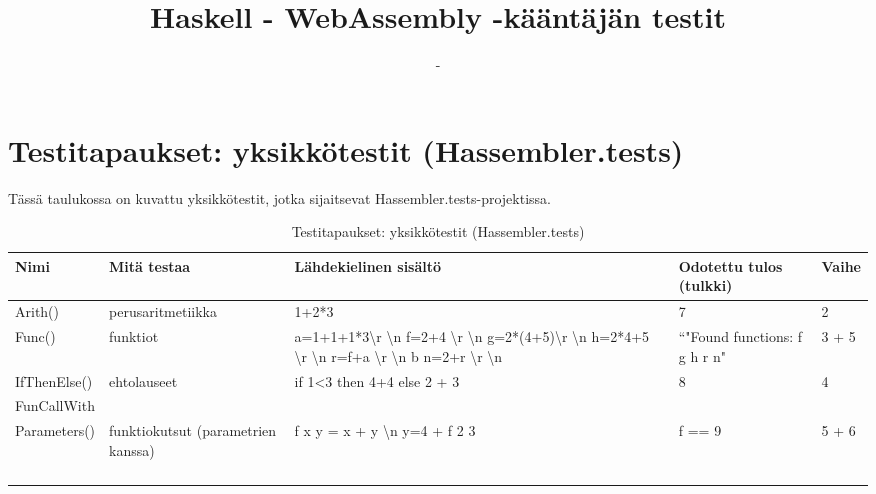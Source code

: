 \documentclass[11pt]{article} %
\title{Haskell - WebAssembly -kääntäjän testit}
\author{-}
\begin{document}
\maketitle


\section{Testitapaukset: yksikkötestit (Hassembler.tests)}

Tässä taulukossa on kuvattu yksikkötestit, jotka sijaitsevat Hassembler.tests-projektissa.

\begin{table}[!htbp] %
\caption{Testitapaukset: yksikkötestit (Hassembler.tests)}
\begin{tabular}{|p{3cm}|p{3cm}|p{5cm}|p{3cm}|p{3cm}|}
\hline
\textbf{Nimi} & \textbf{Mitä testaa} & \textbf{Lähdekielinen sisältö} & \textbf{Odotettu tulos (tulkki)}  & \textbf{Vaihe} \\ \hline
 Arith()             & perusaritmetiikka         & 1+2*3   &  7                                  &  2              \\ \hline
 Func()             & funktiot   & a=1+1+1*3\textbackslash r \textbackslash n f=2+4 \textbackslash r \textbackslash n g=2*(4+5)\textbackslash r \textbackslash n h=2*4+5 \textbackslash r \textbackslash n r=f+a \textbackslash r \textbackslash n b n=2+r \textbackslash r \textbackslash n                     &  ``"Found functions: f g h r n"         &   3 + 5                                                \\ \hline
 IfThenElse()    & ehtolauseet                & if 1<3 then 4+4 else 2 + 3   &  8         & 4    \\ \hline
 FunCallWith&&&&\\Parameters()   &  funktiokutsut (parametrien kanssa)  &  f x y = x + y \textbackslash n   y=4 + f 2 3     & f == 9        &  5 + 6             \\ \hline

              &                      &                       &           &                                                  \\ \hline
              &                      &                       &           &                                                   \\ \hline
              &                      &                       &           &                                                   \\ \hline
              &                      &                       &           &                                                   \\ \hline
              
             
\end{tabular}
\end{table}
\end{document}
